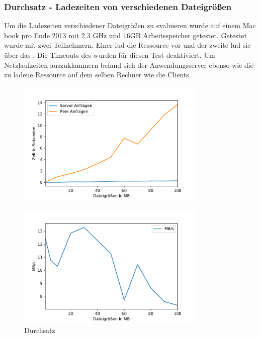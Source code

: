 \subsubsection{Durchsatz - Ladezeiten von verschiedenen Dateigrößen}
Um die Ladezeiten verschiedener Dateigrößen zu evaluieren wurde auf einem Mac book pro Ende 2013 mit 2.3 GHz und 16GB Arbeitsspeicher getestet. 
Getestet wurde mit zwei Teilnehmern. Einer lud die Ressource vor und der zweite lud sie über das \pTp \cdn. Die Timeouts des \pTp \cdns wurden für diesen Test deaktiviert. Um Netzlaufzeiten auszuklammern befand sich der Anwendungsserver ebenso wie die zu ladene Ressource auf dem selben Rechner wie die Clients. 

\begin{figure}[!h]
	\centering
	\includegraphics[width=0.8\textwidth]{figures/Timing_file_size}
	\caption[A Figure Short-Title]{}
	\label{fig:timing_file_size}
\end{figure}

\begin{figure}[!h]
	\centering
	\includegraphics[width=0.8\textwidth]{figures/durchsatz_file_size}
	\caption[A Figure Short-Title]{Durchsatz}
	\label{fig:durchsatz_file_size}
\end{figure}


